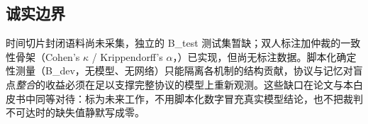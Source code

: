 \subsection{诚实边界}

时间切片封闭语料尚未采集，独立的 B\_test 测试集暂缺；双人标注加仲裁的一致性骨架（Cohen's $\kappa$ / Krippendorff's $\alpha$，）已实现，但尚无标注数据。脚本化确定性测量（B\_dev，无模型、无网络）只能隔离各机制的结构贡献，协议与记忆对盲点\emph{整合}的收益必须在足以支撑完整协议的模型上重新观测。这些缺口在论文与本白皮书中同等对待：标为未来工作，不用脚本化数字冒充真实模型结论，也不把裁判不可达时的缺失值静默写成零。

